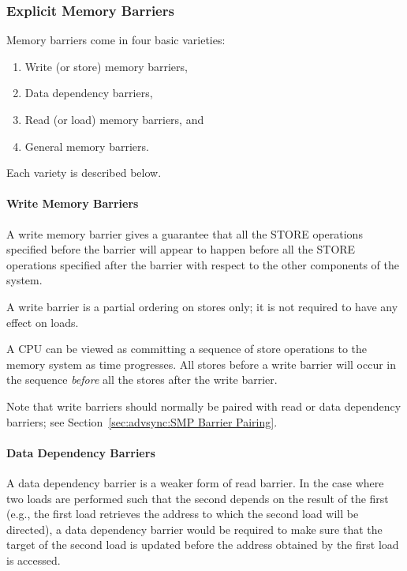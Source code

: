 \subsubsection{Explicit Memory Barriers}
\label{sec:advsync:Explicit Memory Barriers}

Memory barriers come in four basic varieties:

\begin{enumerate}
\item	Write (or store) memory barriers,
\item	Data dependency barriers,
\item	Read (or load) memory barriers, and
\item	General memory barriers.
\end{enumerate}

Each variety is described below.

\paragraph{Write Memory Barriers}

A write memory barrier gives a guarantee that all the STORE operations
specified before the barrier will appear to happen before all the STORE
operations specified after the barrier with respect to the other
components of the system.

A write barrier is a partial ordering on stores only; it is not required
to have any effect on loads.

A CPU can be viewed as committing a sequence of store operations to the
memory system as time progresses.  All stores before a write barrier will
occur in the sequence \emph{before} all the stores after the write barrier.

Note that write barriers should normally be paired with read
or data dependency barriers; see
Section~\ref{sec:advsync:SMP Barrier Pairing}.

\paragraph{Data Dependency Barriers}

A data dependency barrier is a weaker form of read barrier.  In the case
where two loads are performed such that the second depends on the result
of the first (e.g., the first load retrieves the address to which the second
load will be directed), a data dependency barrier would be required to
make sure that the target of the second load is updated before the address
obtained by the first load is accessed.

